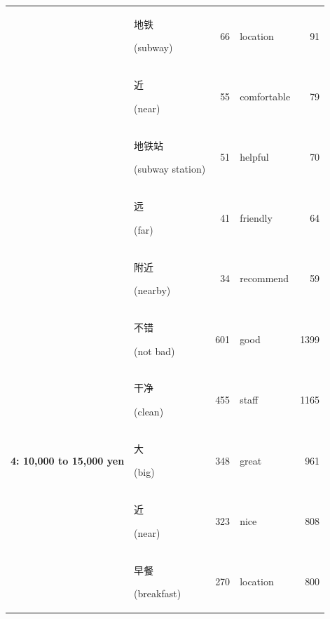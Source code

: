 \documentclass[smallextended,natbib]{svjour3}       %
\begin{document}
\begin{table}[ht]
{\begin{tabular}{|c|lr|lr|}
                                                             & \begin{CJK}{UTF8}{gbsn}地铁\end{CJK} (subway)          & 66    & location    & 91    \\  
                                                             & \begin{CJK}{UTF8}{gbsn}近\end{CJK} (near)             & 55    & comfortable & 79    \\  
                                                             & \begin{CJK}{UTF8}{gbsn}地铁站\end{CJK} (subway station) & 51    & helpful     & 70    \\  
                                                             & \begin{CJK}{UTF8}{gbsn}远\end{CJK} (far)              & 41    & friendly    & 64    \\  
                                                             & \begin{CJK}{UTF8}{gbsn}附近\end{CJK} (nearby)          & 34    & recommend   & 59    \\ \hline
        \multirow{10}{*}{\textbf{4: 10,000 to 15,000 yen}}   & \begin{CJK}{UTF8}{gbsn}不错\end{CJK} (not bad)         & 601   & good        & 1399  \\  
                                                             & \begin{CJK}{UTF8}{gbsn}干净\end{CJK} (clean)           & 455   & staff       & 1165  \\  
                                                             & \begin{CJK}{UTF8}{gbsn}大\end{CJK} (big)              & 348   & great       & 961   \\  
                                                             & \begin{CJK}{UTF8}{gbsn}近\end{CJK} (near)             & 323   & nice        & 808   \\  
                                                             & \begin{CJK}{UTF8}{gbsn}早餐\end{CJK} (breakfast)       & 270   & location    & 800   \\  

\end{tabular}}
\end{table}
\end{document}
